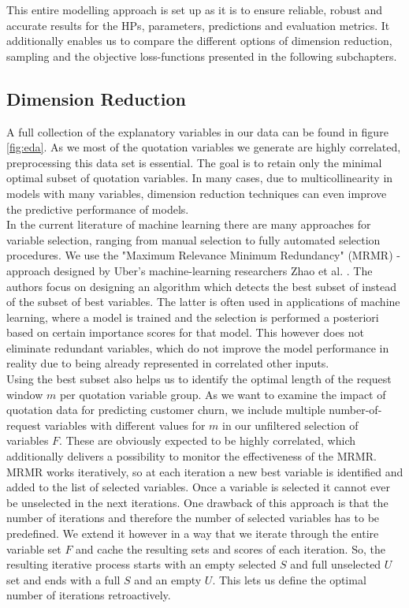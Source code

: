 \documentclass[12pt,titlepage]{article}
\begin{document}
\noindent
This entire modelling approach is set up as it is to ensure reliable, robust and accurate results for the HPs, parameters, predictions and evaluation metrics. It additionally enables us to compare the different options of dimension reduction, sampling and the objective loss-functions presented in the following subchapters. \\

\subsection{Dimension Reduction} \par
\label{chap:mrmr}

A full collection of the explanatory variables in our data can be found in figure \ref{fig:eda}. As we most of the quotation variables we generate are highly correlated, preprocessing this data set is essential. The goal is to retain only the minimal optimal subset of quotation variables. In many cases, due to multicollinearity in models with many variables, dimension reduction techniques can even improve the predictive performance of models. \\
In the current literature of machine learning there are many approaches for variable selection, ranging from manual selection to fully automated selection procedures. We use the "Maximum Relevance Minimum Redundancy" (MRMR) - approach designed by Uber's machine-learning researchers Zhao et al. \cite{mrmr}. The authors focus on designing an algorithm which detects the best subset of instead of the subset of best variables. The latter is often used in applications of machine learning, where a model is trained and the selection is performed a posteriori based on certain importance scores for that model. This however does not eliminate redundant variables, which do not improve the model performance in reality due to being already represented in correlated other inputs. \\
Using the best subset also helps us to identify the optimal length of the request window $m$ per quotation variable group. As we want to examine the impact of quotation data for predicting customer churn, we include multiple number-of-request variables with different values for $m$ in our unfiltered selection of variables $F$. These are obviously expected to be highly correlated, which additionally delivers a possibility to monitor the effectiveness of the MRMR. \\
MRMR works iteratively, so at each iteration a new best variable is identified and added to the list of selected variables. Once a variable is selected it cannot ever be unselected in the next iterations. One drawback of this approach is that the number of iterations and therefore the number of selected variables has to be predefined. We extend it however in a way that we iterate through the entire variable set $F$ and cache the resulting sets and scores of each iteration. So, the resulting iterative process starts with an empty selected $S$ and full unselected $U$ set and ends with a full $S$ and an empty $U$. This lets us define the optimal number of iterations retroactively. \\
\end{document}

